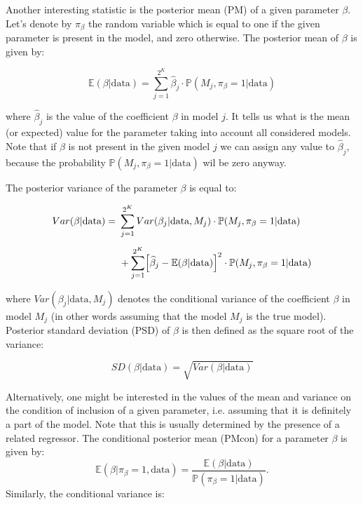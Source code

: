 \documentclass[a4paper]{article}
\begin{document}
Another interesting statistic is the posterior mean (PM) of a given parameter $\beta$.
Let's denote by $\pi_{\beta}$ the random variable which is equal to one if the given parameter is present in the model, and zero otherwise.
The posterior mean of $\beta$ is given by:

\begin{equation}\label{pm}
\mathbb{E}(\beta|\text{data})=\sum_{j=1}^{2^K}\widehat{\beta}_{j} \cdot \mathbb{P}(M_{j}, \pi_{\beta} = 1 |\text{data})
\end{equation}

\noindent where $\widehat{\beta}_{j}$ is the value of the coefficient $\beta$ in model $j$.
It tells us what is the mean (or expected) value for the parameter taking into account all considered models.
Note that if $\beta$ is not present in the given model $j$ we can assign any value to $\widehat{\beta}_{j}$,
because the probability $\mathbb{P}(M_{j}, \pi_{\beta} = 1 |\text{data})$ wil be zero anyway.

The posterior variance of the parameter $\beta$ is equal to:

\begin{equation}
\begin{split}
Var(\beta|\text{data}) =\ &\sum_{j=1}^{2^K}Var(\beta_{j}|\text{data},M_{j}) \cdot \mathbb{P}(M_{j}, \pi_{\beta} = 1 |\text{data})\\[1ex]
&+\sum_{j=1}^{2^K}\Bigl[\widehat{\beta}_{j}-\mathbb{E}(\beta|\text{data})\Bigr]^{2} \cdot \mathbb{P}(M_{j}, \pi_{\beta} = 1 |\text{data})
\end{split}
\end{equation}

\noindent where $Var(\beta_{j}|\text{data},M_{j})$ denotes the conditional variance of the coefficient $\beta$ in model $M_{j}$
(in other words assuming that the model $M_j$ is the true model).
Posterior standard deviation (PSD) of $\beta$ is then defined as the square root of the variance:

\begin{equation}\label{psd}
SD(\beta | \text{data}) = \sqrt{ Var(\beta | \text{data}) }
\end{equation}

\indent Alternatively, one might be interested in the values of the mean and variance on the condition of inclusion of a given parameter,
i.e. assuming that it is definitely a part of the model.
Note that this is usually determined by the presence of a related regressor.
The conditional posterior mean (PMcon) for a parameter $\beta$ is given by:
\begin{equation}
\mathbb{E}(\beta | \pi_{\beta}=1,\text{data})=\frac{\mathbb{E}(\beta|\text{data})}{\mathbb{P}(\pi_{\beta} = 1|\text{data})}.
\end{equation}
Similarly, the conditional variance is:
\end{document}
